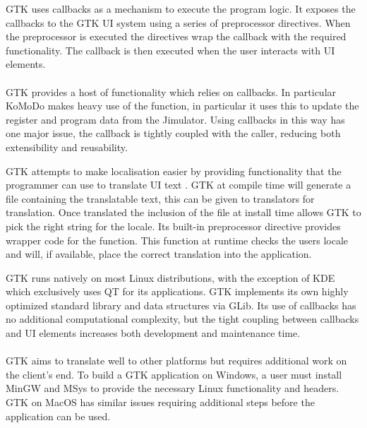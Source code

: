  GTK uses callbacks as a mechanism to execute the program logic. It exposes the callbacks to the GTK UI system using a series of preprocessor directives. When the preprocessor is executed the directives wrap the callback with the required functionality. The callback is then executed when the user interacts with UI elements.\\\\
  GTK provides a host of functionality which relies on callbacks. In particular KoMoDo makes heavy use of the  function, in particular it uses this to update the register and program data from the Jimulator. Using callbacks in this way has one major issue, the callback is tightly coupled with the caller, reducing both extensibility and reusability.

  GTK attempts to make localisation easier by providing functionality that the programmer can use to translate UI text \cite{gtk_localisation}. GTK at compile time will generate a file containing the translatable text, this can be given to translators for translation. Once translated the inclusion of the file at install time allows GTK to pick the right string for the locale. Its built-in preprocessor directive provides wrapper code for the  function. This function at runtime checks the users locale and will, if available, place the correct translation into the application.

  GTK runs natively on most Linux distributions, with the exception of KDE which exclusively uses QT for its applications. GTK implements its own highly optimized standard library and data structures via GLib\cite{glib}. Its use of callbacks has no additional computational complexity, but the tight coupling between callbacks and UI elements increases both development and maintenance time.\\\\
  GTK aims to translate well to other platforms but requires additional work on the client's end. To build a GTK application on Windows, a user must install MinGW and MSys to provide the necessary Linux functionality and headers. GTK on MacOS has similar issues requiring additional steps before the application can be used.

